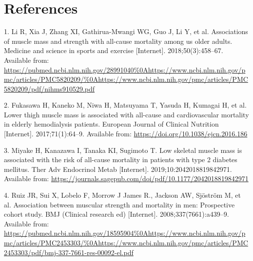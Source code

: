 \documentclass[twoside,10pt]{gihclass} %
\begin{document}
\backmatter

\hypertarget{references}{%
\chapter*{References}\label{references}}


\noindent

\setlength{\parindent}{-0.20in}
\setlength{\leftskip}{0.20in}
\setlength{\parskip}{8pt}

\hypertarget{refs}{}
\leavevmode\hypertarget{ref-RN2512}{}%
1. Li R, Xia J, Zhang XI, Gathirua-Mwangi WG, Guo J, Li Y, et al. Associations of muscle mass and strength with all-cause mortality among us older adults. Medicine and science in sports and exercise {[}Internet{]}. 2018;50(3):458--67. Available from: \url{https://pubmed.ncbi.nlm.nih.gov/28991040\%0Ahttps://www.ncbi.nlm.nih.gov/pmc/articles/PMC5820209/\%0Ahttps://www.ncbi.nlm.nih.gov/pmc/articles/PMC5820209/pdf/nihms910529.pdf}

\leavevmode\hypertarget{ref-RN2513}{}%
2. Fukasawa H, Kaneko M, Niwa H, Matsuyama T, Yasuda H, Kumagai H, et al. Lower thigh muscle mass is associated with all-cause and cardiovascular mortality in elderly hemodialysis patients. European Journal of Clinical Nutrition {[}Internet{]}. 2017;71(1):64--9. Available from: \url{https://doi.org/10.1038/ejcn.2016.186}

\leavevmode\hypertarget{ref-RN2514}{}%
3. Miyake H, Kanazawa I, Tanaka KI, Sugimoto T. Low skeletal muscle mass is associated with the risk of all-cause mortality in patients with type 2 diabetes mellitus. Ther Adv Endocrinol Metab {[}Internet{]}. 2019;10:2042018819842971. Available from: \url{https://journals.sagepub.com/doi/pdf/10.1177/2042018819842971}

\leavevmode\hypertarget{ref-RN2376}{}%
4. Ruiz JR, Sui X, Lobelo F, Morrow J James R., Jackson AW, Sjöström M, et al. Association between muscular strength and mortality in men: Prospective cohort study. BMJ (Clinical research ed) {[}Internet{]}. 2008;337(7661):a439--9. Available from: \url{https://pubmed.ncbi.nlm.nih.gov/18595904\%0Ahttps://www.ncbi.nlm.nih.gov/pmc/articles/PMC2453303/\%0Ahttps://www.ncbi.nlm.nih.gov/pmc/articles/PMC2453303/pdf/bmj-337-7661-res-00092-el.pdf}
\end{document}
